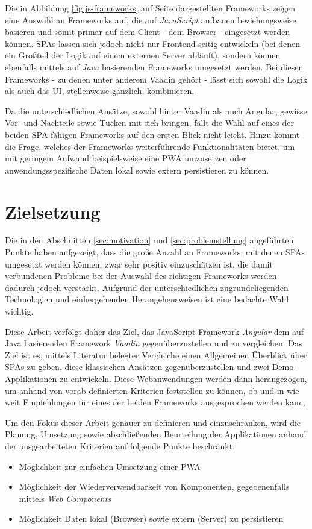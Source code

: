 \documentclass[a4paper,12pt,twoside]{scrreprt}
\begin{document}
Die in Abbildung \ref{fig:js-frameworks} auf Seite \pageref{fig:js-frameworks} dargestellten Frameworks zeigen eine Auswahl an Frameworks auf, die auf \textit{JavaScript} aufbauen beziehungsweise basieren und somit primär auf dem Client - dem Browser - eingesetzt werden können. \aclp{SPA} lassen sich jedoch nicht nur Frontend-seitig entwickeln (bei denen ein Großteil der Logik auf einem externen Server abläuft), sondern können ebenfalls mittels auf \textit{Java} basierenden Frameworks umgesetzt werden. Bei diesen Frameworks - zu denen unter anderem Vaadin gehört - lässt sich sowohl die Logik als auch das \ac{UI}, stellenweise gänzlich, kombinieren.

Da die unterschiedlichen Ansätze, sowohl hinter Vaadin als auch Angular, gewisse Vor- und Nachteile sowie Tücken mit sich bringen, fällt die Wahl auf eines der beiden \acs{SPA}-fähigen Frameworks auf den ersten Blick nicht leicht. Hinzu kommt die Frage, welches der Frameworks weiterführende Funktionalitäten bietet, um mit geringem Aufwand beispielsweise eine \ac{PWA} umzusetzen oder anwendungsspezifische Daten lokal sowie extern persistieren zu können.

\section{Zielsetzung}
\label{sec:zielsetzung}
Die in den Abschnitten \ref{sec:motivation} und \ref{sec:problemstellung} angeführten Punkte haben aufgezeigt, dass die große Anzahl an Frameworks, mit denen \aclp{SPA} umgesetzt werden können, zwar sehr positiv einzuschätzen ist, die damit verbundenen Probleme bei der Auswahl des richtigen Frameworks werden dadurch jedoch verstärkt. Aufgrund der unterschiedlichen zugrundeliegenden Technologien und einhergehenden Herangehensweisen ist eine bedachte Wahl wichtig.

Diese Arbeit verfolgt daher das Ziel, das JavaScript Framework \textit{Angular} dem auf Java basierenden Framework \textit{Vaadin} gegenüberzustellen und zu vergleichen. Das Ziel ist es, mittels Literatur belegter Vergleiche einen Allgemeinen Überblick über \aclp{SPA} zu geben, diese klassischen Ansätzen gegenüberzustellen und zwei Demo-Applikationen zu entwickeln. Diese Webanwendungen werden dann herangezogen, um anhand von vorab definierten Kriterien feststellen zu können, ob und in wie weit Empfehlungen für eines der beiden Frameworks ausgesprochen werden kann.

\medskip

Um den Fokus dieser Arbeit genauer zu definieren und einzuschränken, wird die Planung, Umsetzung sowie abschließenden Beurteilung der Applikationen anhand der ausgearbeiteten Kriterien auf folgende Punkte beschränkt:
\begin{itemize}
    \item Möglichkeit zur einfachen Umsetzung einer \acf{PWA}
    \item Möglichkeit der Wiederverwendbarkeit von Komponenten, gegebenenfalls mittels \textit{Web Components}
    \item Möglichkeit Daten lokal (Browser) sowie extern (Server) zu persistieren
\end{itemize}
\end{document}
